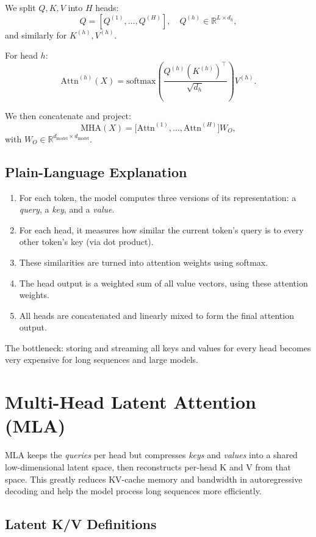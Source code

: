 \documentclass[11pt]{article}
\theoremstyle{remark}
\newcommand{\highlight}[1]{\colorbox{yellow!40}{#1}}
\begin{document}
We split $Q, K, V$ into $H$ heads:
\[
Q = [Q^{(1)}, \dots, Q^{(H)}], \quad
Q^{(h)} \in \mathbb{R}^{L \times d_h},
\]
and similarly for $K^{(h)}, V^{(h)}$.

For head $h$:
\[
\text{Attn}^{(h)}(X)
=
\text{softmax}\!\left(
\frac{Q^{(h)} (K^{(h)})^{\top}}{\sqrt{d_h}}
\right) V^{(h)}.
\]

We then concatenate and project:
\[
\text{MHA}(X)
= \big[ \text{Attn}^{(1)}, \dots, \text{Attn}^{(H)} \big] W_O,
\]
with $W_O \in \mathbb{R}^{d_{\text{model}} \times d_{\text{model}}}$.

\subsection{Plain-Language Explanation}

\begin{enumerate}[label=\arabic*)]
  \item For each token, the model computes three versions of its representation: a \emph{query}, a \emph{key}, and a \emph{value}.
  \item For each head, it measures how similar the current token's query is to every other token's key (via dot product).
  \item These similarities are turned into attention weights using softmax.
  \item The head output is a weighted sum of all value vectors, using these attention weights.
  \item All heads are concatenated and linearly mixed to form the final attention output.
\end{enumerate}

The bottleneck: storing and streaming all keys and values for every head becomes very expensive for long sequences and large models.

\section{Multi-Head Latent Attention (MLA)}

MLA keeps the \emph{queries} per head but \highlight{compresses \emph{keys} and \emph{values} into a shared low-dimensional latent space}, then reconstructs per-head K and V from that space. This greatly reduces KV-cache memory and bandwidth in autoregressive decoding and help the model process \highlight{long sequences} more efficiently.

\subsection{Latent K/V Definitions}
\end{document}

